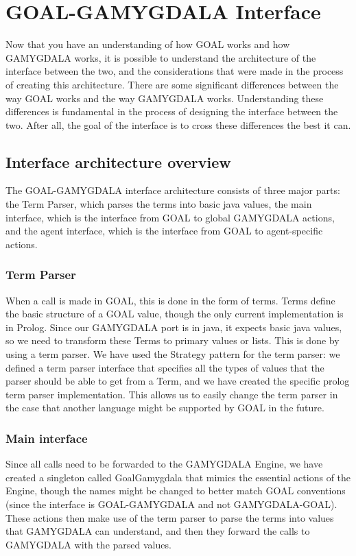 \section{GOAL-GAMYGDALA Interface}
Now that you have an understanding of how GOAL works and how GAMYGDALA works, it is possible to understand the architecture of the interface between the two, and the considerations that were made in the process of creating this architecture.
There are some significant differences between the way GOAL works and the way GAMYGDALA works. Understanding these differences is fundamental in the process of designing the interface between the two. After all, the goal of the interface is to cross these differences the best it can.

\subsection{Interface architecture overview}
The GOAL-GAMYGDALA interface architecture consists of three major parts: the Term Parser, which parses the terms into basic java values, the main interface, which is the interface from GOAL to global GAMYGDALA actions, and the agent interface, which is the interface from GOAL to agent-specific actions.

\subsubsection{Term Parser}
When a call is made in GOAL, this is done in the form of terms. Terms define the basic structure of a GOAL value, though the only current implementation is in Prolog. Since our GAMYGDALA port is in java, it expects basic java values, so we need to transform these Terms to primary values or lists. This is done by using a term parser.
We have used the Strategy pattern for the term parser: we defined a term parser interface that specifies all the types of values that the parser should be able to get from a Term, and we have created the specific prolog term parser implementation. This allows us to easily change the term parser in the case that another language might be supported by GOAL in the future.

\subsubsection{Main interface}
Since all calls need to be forwarded to the GAMYGDALA Engine, we have created a singleton called GoalGamygdala that mimics the essential actions of the Engine, though the names might be changed to better match GOAL conventions (since the interface is GOAL-GAMYGDALA and not GAMYGDALA-GOAL). These actions then make use of the term parser to parse the terms into values that GAMYGDALA can understand, and then they forward the calls to GAMYGDALA with the parsed values.

